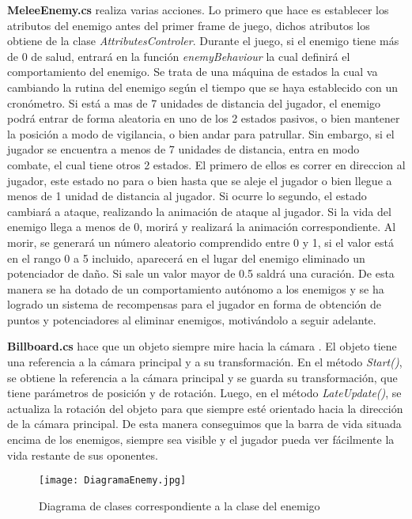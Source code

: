 \textbf{MeleeEnemy.cs} realiza varias acciones. Lo primero que hace es establecer los atributos del enemigo antes del primer frame de juego, dichos atributos los obtiene de la clase \textit{AttributesControler}. Durante el juego, si el enemigo tiene más de 0 de salud, entrará en la función \textit{enemyBehaviour} la cual definirá el comportamiento del enemigo. Se trata de una máquina de estados la cual va cambiando la rutina del enemigo según el tiempo que se haya establecido con un cronómetro. Si está a mas de 7 unidades de distancia del jugador, el enemigo podrá entrar de forma aleatoria en uno de los 2 estados pasivos, o bien mantener la posición a modo de vigilancia, o bien andar para patrullar. Sin embargo, si el jugador se encuentra a menos de 7 unidades de distancia, entra en modo combate, el cual tiene otros 2 estados. El primero de ellos es correr en direccion al jugador, este estado no para o bien hasta que se aleje el jugador o bien llegue a menos de 1 unidad de distancia al jugador. Si ocurre lo segundo, el estado cambiará a ataque, realizando la animación de ataque al jugador. Si la vida del enemigo llega a menos de 0, morirá y realizará la animación correspondiente. Al morir, se generará un número aleatorio comprendido entre 0 y 1, si el valor está en el rango 0 a 5 incluido, aparecerá en el lugar del enemigo eliminado un potenciador  de daño. Si sale un valor mayor de 0.5 saldrá una curación. De esta manera se ha dotado de un comportamiento autónomo a los enemigos y se ha logrado un sistema de recompensas para el jugador en forma de obtención de puntos y potenciadores al eliminar enemigos, motivándolo a seguir adelante.

\textbf{Billboard.cs} hace que un objeto siempre mire hacia la cámara . El objeto tiene una referencia a la cámara principal y a su transformación. En el método \textit{Start()}, se obtiene la referencia a la cámara principal y se guarda su transformación, que tiene parámetros de posición y de rotación. Luego, en el método \textit{LateUpdate()}, se actualiza la rotación del objeto para que siempre esté orientado hacia la dirección de la cámara principal. De esta manera conseguimos que la barra de vida situada encima de los enemigos, siempre sea visible y el jugador pueda ver fácilmente la vida restante de sus oponentes.

\begin{figure}[H]
    \centering
    \texttt{[image: DiagramaEnemy.jpg]}
    \caption{Diagrama de clases correspondiente a la clase del enemigo}
\end{figure}

